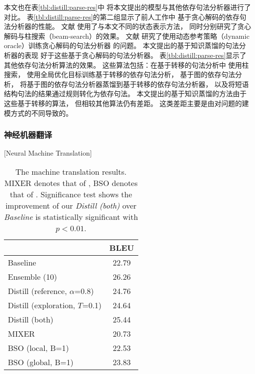 本文也在表\ref{tbl:distill:parse-res}中
将本文提出的模型与其他依存句法分析器进行了对比。
表\ref{tbl:distill:parse-res}的第二组显示了前人工作中
基于贪心解码的依存句法分析器的性能。
文献
使用了与本文不同的状态表示方法，
同时分别研究了贪心解码与柱搜索（beam-search）的效果。
文献
研究了使用动态参考策略（dynamic oracle）训练贪心解码的句法分析器
的问题。
本文提出的基于知识蒸馏的句法分析器的表现
好于这些基于贪心解码的句法分析器。
表\ref{tbl:distill:parse-res}显示了
其他依存句法分析算法的效果。
这些算法包括：在基于转移的句法分析中
使用柱搜索\cite{buckman-ballesteros-dyer:2016:EMNLP2016,andor-EtAl:2016:P16-1}，
使用全局优化目标训练基于转移的依存句法分析\cite{andor-EtAl:2016:P16-1}，
基于图的依存句法分析\cite{DBLP:journals/corr/DozatM16}，
将基于图的依存句法分析器蒸馏到基于转移的依存句法分析器\cite{kuncoro-16}，
以及将短语结构句法的结果通过规则转化为依存句法\cite{kuncoro-17}。
本文提出的基于知识蒸馏的方法由于这些基于转移的算法，
但相较其他算法仍有差距。
这类差距主要是由对问题的建模方式的不同导致的。

\subsubsection{神经机器翻译}[Neural Machine Translation]

\begin{table}[t]
	\centering
	\begin{tabular}{lc}
		\hline
		& BLEU \\
		\hline
		Baseline & 22.79 \\
		Ensemble (10) & 26.26 \\
		Distill (reference, $\alpha$=0.8) & 24.76 \\
		Distill (exploration, $T$=0.1) & 24.64 \\
		Distill (both) & 25.44 \\
		\hdashline
		MIXER & 20.73 \\
		BSO (local, B=1) & 22.53 \\
		BSO (global, B=1) & 23.83 \\
		\hline
	\end{tabular}
	\caption{The machine translation results.
		MIXER denotes that of \citet{DBLP:journals/corr/RanzatoCAZ15},
		BSO  denotes that of \citet{wiseman-rush:2016:EMNLP2016}.
		Significance test \cite{koehn:2004:EMNLP} shows the improvement of our \textit{Distill (both)} over \textit{Baseline}
		is statistically significant with $p<0.01$.
	}\label{tbl:distill:nmt-res}
\end{table}

